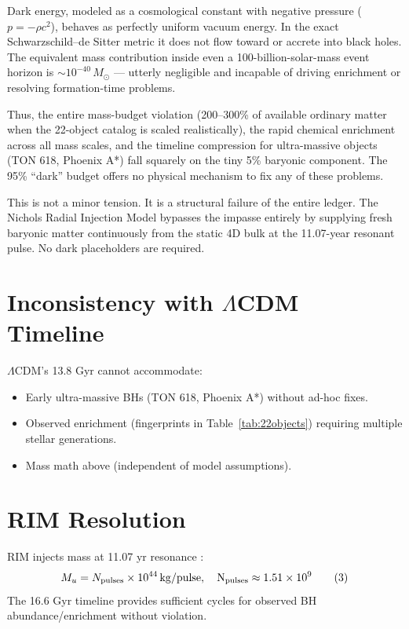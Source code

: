 \documentclass[12pt]{article}
\begin{document}
Dark energy, modeled as a cosmological constant with negative pressure ($p = -\rho c^2$), behaves as perfectly uniform vacuum energy. In the exact Schwarzschild--de Sitter metric it does not flow toward or accrete into black holes. The equivalent mass contribution inside even a 100-billion-solar-mass event horizon is $\sim 10^{-40}\,M_\odot$ — utterly negligible and incapable of driving enrichment or resolving formation-time problems.

Thus, the entire mass-budget violation (200--300\% of available ordinary matter when the 22-object catalog is scaled realistically), the rapid chemical enrichment across all mass scales, and the timeline compression for ultra-massive objects (TON 618, Phoenix A*) fall squarely on the tiny 5\% baryonic component. The 95\% “dark” budget offers no physical mechanism to fix any of these problems.

This is not a minor tension. It is a structural failure of the entire ledger. The Nichols Radial Injection Model bypasses the impasse entirely by supplying fresh baryonic matter continuously from the static 4D bulk at the 11.07-year resonant pulse. No dark placeholders are required.

\section{Inconsistency with $\Lambda$CDM Timeline}
$\Lambda$CDM's 13.8 Gyr cannot accommodate:
\begin{itemize}
\item Early ultra-massive BHs (TON 618, Phoenix A*) without ad-hoc fixes.
\item Observed enrichment (fingerprints in Table~\ref{tab:22objects}) requiring multiple stellar generations.
\item Mass math above (independent of model assumptions).
\end{itemize}

\section{RIM Resolution}
RIM injects mass at 11.07 yr resonance \citep{rimV}:
\begin{equation}
M_u = N_{\rm pulses} \times 10^{44} \, \rm kg/pulse, \quad N_{\rm pulses} \approx 1.51 \times 10^9 \tag{3}
\end{equation}
The 16.6 Gyr timeline provides sufficient cycles for observed BH abundance/enrichment without violation.
\end{document}
